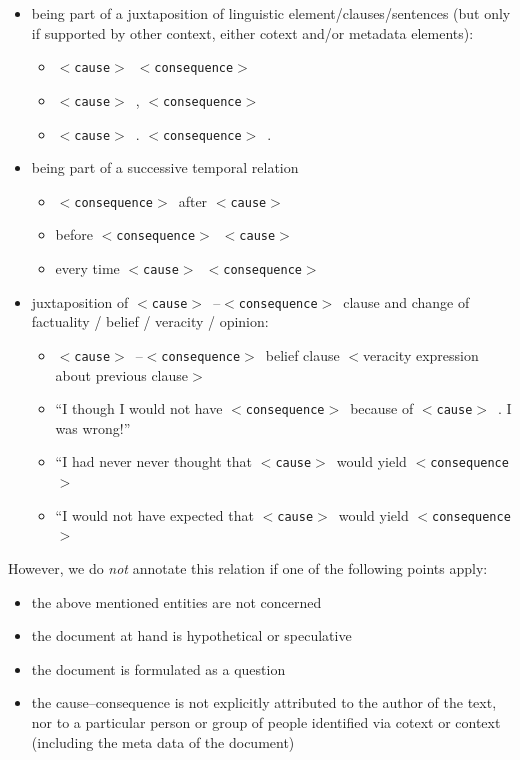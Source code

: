 \documentclass[12pt]{article}
\theoremstyle{definition}
\newcommand{\cause}{$<$\texttt{cause}$>$\ }
\newcommand{\conseq}{$<$\texttt{consequence}$>$\ }
\begin{document}
\begin{itemize}
    \item being part of a juxtaposition of linguistic element/clauses/sentences (but only if supported by other context, either cotext and/or metadata elements):
    \begin{itemize}
        \item \cause \conseq
        \item \cause, \conseq
        \item \cause. \conseq.
    \end{itemize}
    \item being part of a successive temporal relation
    \begin{itemize}
        \item \conseq after \cause
        \item before \conseq \cause
        \item every time \cause \conseq
    \end{itemize}
    \item juxtaposition of \cause--\conseq clause and change of factuality / belief / veracity / opinion:
    \begin{itemize}
        \item \cause--\conseq belief clause  $<$veracity expression about previous clause$>$
        \item ``I though I would not have \conseq because of \cause. I was wrong!''
        \item ``I had never never thought that \cause would yield \conseq
        \item ``I would not have expected that \cause would yield \conseq
    \end{itemize}


 
\end{itemize}


However, we do \emph{not} annotate this relation if one of the following points apply:

\begin{itemize}
    \item the above mentioned entities are not concerned
    \item the document at hand is hypothetical or speculative
    \item the document is formulated as a question
    \item the cause--consequence is not explicitly attributed to the author of the text, nor to a particular person or group of people identified via cotext or context (including the meta data of the document)
\end{itemize}
\end{document}
